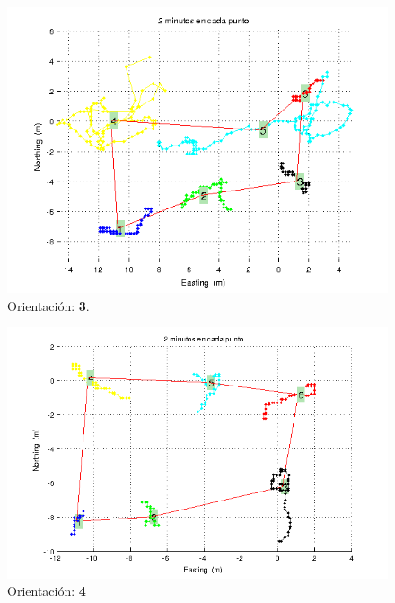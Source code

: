 \documentclass[spanish,12pt,a4paper,titlepage]{report}
\begin{document}
\newpage
\begin{figure}[h!]
  \includegraphics[width=1\textwidth]{./img/or2_poly_cut.png}
  \caption{Orientación: \textbf{3}.}
\vspace{-30pt}
  \label{fig:or2_poly_cut.png}
\end{figure}

\begin{figure}[h!]
  \includegraphics[width=.9\textwidth]{./img/or3_pol.png}
  \caption{Orientación: \textbf{4}}
  \label{fig:or3_pol.png}
\end{figure}



% 
\end{document}
